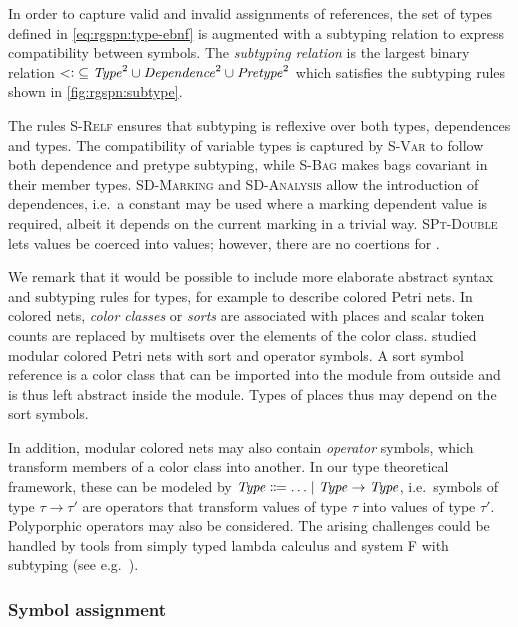 In order to capture valid and invalid assignments of references, the set of types defined in \cref{eq:rgspn:type-ebnf} is augmented with a subtyping relation to express compatibility between symbols. The \emph{ subtyping relation} is the largest binary relation \({\mathrel{<\vcentcolon}} \subseteq \textrm{\itshape Type\/}^2 \cup \textrm{\itshape Dependence\/}^2 \cup \textrm{\itshape Pretype\/}^2\) which satisfies the subtyping rules shown in \cref{fig:rgspn:subtype}.

The rules \textsc{S-Relf} ensures that subtyping is reflexive over both types, dependences and types. The compatibility of variable types is captured by \textsc{S-Var} to follow both dependence and pretype subtyping, while \textsc{S-Bag} makes bags covariant in their member types. \textsc{SD-Marking} and \textsc{SD-Analysis} allow the introduction of dependences, i.e.~a constant may be used where a marking dependent value is required, albeit it depends on the current marking in a trivial way. \textsc{SPt-Double} lets  values be coerced into  values; however, there are no coertions for .

We remark that it would be possible to include more elaborate abstract syntax and subtyping rules for types, for example to describe colored Petri nets. In colored nets, \emph{color classes} or \emph{sorts} are associated with places and scalar token counts are replaced by multisets over the elements of the color class. \citet{Kindler07modular} studied modular colored Petri nets with sort and operator symbols. A sort symbol reference is a color class that can be imported into the module from outside and is thus left abstract inside the module. Types of places thus may depend on the sort symbols.

In addition, modular colored nets may also contain \emph{operator} symbols, which transform members of a color class into another. In our type theoretical framework, these can be modeled by \(\textrm{\itshape Type\/} \Coloneqq \ldots \mid \textrm{\itshape Type\/} \rightarrow \textrm{\itshape Type\/}\), i.e.~symbols of type \(\tau \to \tau'\) are operators that transform values of type \(\tau\) into values of type \(\tau'\). Polyporphic operators may also be considered. The arising challenges could be handled by tools from simply typed lambda calculus and system F with subtyping (see e.g.~\citet[Chapters~15 and~26]{Pierce02tapl}).

\subsubsection{Symbol assignment}

